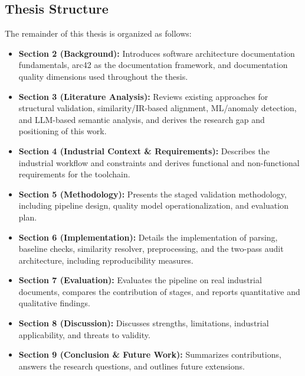 \subsection{Thesis Structure}
The remainder of this thesis is organized as follows:
\begin{itemize}
    \item \textbf{Section 2 (Background):} Introduces software architecture documentation fundamentals, arc42 as the documentation framework, and documentation quality dimensions used throughout the thesis.
    \item \textbf{Section 3 (Literature Analysis):} Reviews existing approaches for structural validation, similarity/IR-based alignment, ML/anomaly detection, and LLM-based semantic analysis, and derives the research gap and positioning of this work.
    \item \textbf{Section 4 (Industrial Context \& Requirements):} Describes the industrial workflow and constraints and derives functional and non-functional requirements for the toolchain.
    \item \textbf{Section 5 (Methodology):} Presents the staged validation methodology, including pipeline design, quality model operationalization, and evaluation plan.
    \item \textbf{Section 6 (Implementation):} Details the implementation of parsing, baseline checks, similarity resolver, preprocessing, and the two-pass audit architecture, including reproducibility measures.
    \item \textbf{Section 7 (Evaluation):} Evaluates the pipeline on real industrial documents, compares the contribution of stages, and reports quantitative and qualitative findings.
    \item \textbf{Section 8 (Discussion):} Discusses strengths, limitations, industrial applicability, and threats to validity.
    \item \textbf{Section 9 (Conclusion \& Future Work):} Summarizes contributions, answers the research questions, and outlines future extensions.
\end{itemize}
